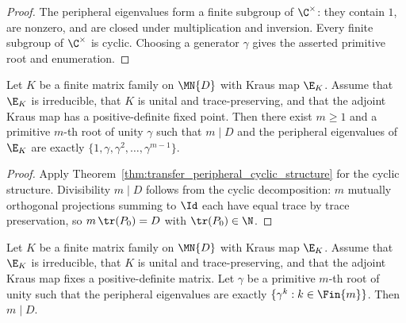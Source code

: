 \begin{proof}
    \leanok
    The peripheral eigenvalues form a finite subgroup of $\C^\times$: they
    contain $1$, are nonzero, and are closed under multiplication and
    inversion. Every finite subgroup of $\C^\times$ is cyclic. Choosing a
    generator $\gamma$ gives the asserted primitive root and enumeration.
\end{proof}

\begin{theorem}%
    \label{thm:peripheral_cyclic_group}
    \leanok
    Let $K$ be a finite matrix family on $\MN{D}$ with Kraus map $\E_K$.
    Assume that $\E_K$ is irreducible, that $K$ is unital and trace-preserving,
    and that the adjoint Kraus map has a positive-definite fixed point. Then
    there exist $m\geq1$ and a primitive $m$-th root of unity
    $\gamma$ such that $m\mid D$ and the peripheral eigenvalues of $\E_K$
    are exactly $\{1,\gamma,\gamma^2,\ldots,\gamma^{m-1}\}$.
\end{theorem}

\begin{proof}
    \leanok
    Apply Theorem~\ref{thm:transfer_peripheral_cyclic_structure} for the cyclic
    structure. Divisibility $m\mid D$ follows from the cyclic
    decomposition: $m$ mutually orthogonal projections summing to $\Id$
    each have equal trace by trace preservation, so
    $m\,\tr(P_0)=D$ with $\tr(P_0)\in\N$.
\end{proof}

\begin{theorem}%
    \label{thm:channel_period_divides_dim}
    \leanok
    Let $K$ be a finite matrix family on $\MN{D}$ with Kraus map $\E_K$.
    Assume that $\E_K$ is irreducible, that $K$ is unital and trace-preserving,
    and that the adjoint Kraus map fixes a positive-definite matrix. Let
    $\gamma$ be a primitive $m$-th root of unity such that the peripheral eigenvalues
    are exactly $\{\gamma^k:k\in\Fin{m}\}$.
    Then $m\mid D$.
\end{theorem}

